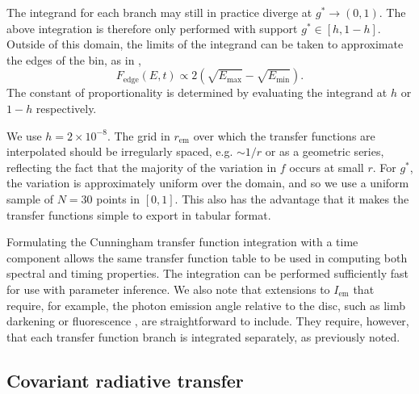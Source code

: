 \documentclass[fleqn,usenatbib]{mnras}
\newcommand{\rhoem}{r_\text{em}}
\begin{document}
The integrand for each branch may still in practice diverge at $g^\ast
\rightarrow (0, 1)$. The above integration is therefore only performed with
support $g^\ast \in [h, 1 - h]$. Outside of this domain, the limits of the
integrand can be taken to approximate the edges of the bin, as in
\citet{dauser_broad_2010},
\begin{equation}
    F_\text{edge}(E,t) \propto 2\left( \sqrt{E_\text{max}} - \sqrt{E_\text{min}} \right).
\end{equation}
The constant of proportionality is determined by evaluating the integrand at $h$
or $1 - h$ respectively.

We use $h = 2 \times 10^{-8}$. The grid in $\rhoem$ over which the transfer
functions are interpolated should be irregularly spaced, e.g.  $\sim 1 / r$ or
as a geometric series, reflecting the fact that the majority of the variation in
$f$ occurs at small $r$. For $g^\ast$, the variation is approximately uniform
over the domain, and so we use a uniform sample of $N = 30$ points in $[0,1]$.
This also has the advantage that it makes the transfer functions simple to
export in tabular format.

Formulating the Cunningham transfer function integration with a time component
allows the same transfer function table to be used in computing both spectral
and timing properties. The integration can be performed sufficiently fast for
use with parameter inference. We also note that extensions to $I_\text{em}$ that
require, for example, the photon emission angle relative to the disc, such as
limb darkening or fluorescence \citep{matt_reflection_1993}, are straightforward
to include. They require, however, that each transfer function branch is
integrated separately, as previously noted.

\subsection{Covariant radiative transfer}
\end{document}
